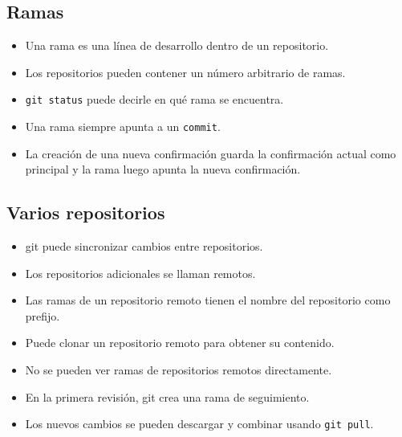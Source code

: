 \subsection{Ramas}

\begin{itemize}
	\item Una rama es una línea de desarrollo dentro de un repositorio.
	\item Los repositorios pueden contener un número arbitrario de ramas.
	\item \texttt{git status} puede decirle en qué rama se encuentra.
	\item Una rama siempre apunta a un \texttt{commit}.
	\item La creación de una nueva confirmación guarda la confirmación actual como principal y la rama luego apunta la nueva confirmación.
\end{itemize}

\subsection{Varios repositorios}

\begin{itemize}
	\item git puede sincronizar cambios entre repositorios.
	\item Los repositorios adicionales se llaman remotos.
	\item Las ramas de un repositorio remoto tienen el nombre del repositorio como prefijo.
	\item Puede clonar un repositorio remoto para obtener su contenido.
	\item No se pueden ver ramas de repositorios remotos directamente.
	\item En la primera revisión, git crea una rama de seguimiento.
	\item Los nuevos cambios se pueden descargar y combinar usando \texttt{git pull}.
\end{itemize}

